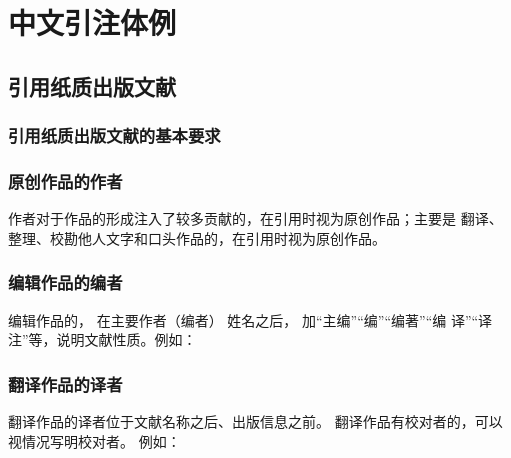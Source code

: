 \documentclass{article}
\begin{document}
\section{中文引注体例}

\subsection{引用纸质出版文献}

\subsubsection{引用纸质出版文献的基本要求}

\subsubsection{原创作品的作者}

作者对于作品的形成注入了较多贡献的，在引用时视为原创作品；主要是
翻译、整理、校勘他人文字和口头作品的，在引用时视为原创作品。

\begin{quotation}
\end{quotation}

\subsubsection{编辑作品的编者}

编辑作品的， 在主要作者（编者） 姓名之后， 加“主编”“编”“编著”“编
译”“译注”等，说明文献性质。例如：

\begin{quotation}
\end{quotation}

\subsubsection{翻译作品的译者}

翻译作品的译者位于文献名称之后、出版信息之前。
翻译作品有校对者的，可以视情况写明校对者。
例如：
\end{document}
